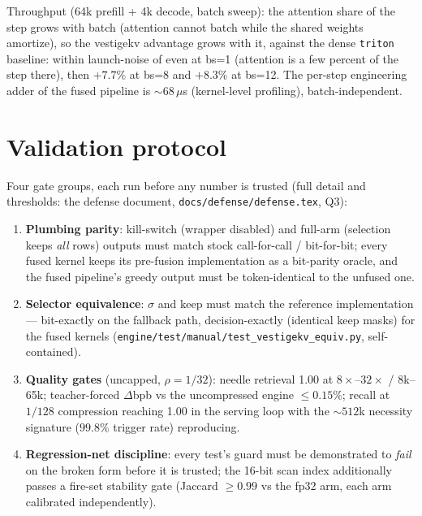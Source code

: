 \documentclass[11pt]{article}
\newcommand{\keep}{\mathrm{keep}}
\begin{document}
Throughput (64k prefill + 4k decode, batch sweep): the attention share of
the step grows with batch (attention cannot batch while the shared weights
amortize), so the vestigekv advantage grows with it, against the dense
\texttt{triton} baseline: within launch-noise of even at bs=1 (attention is
a few percent of the step there), then $+7.7\%$ at bs=8 and $+8.3\%$ at
bs=12. The per-step engineering adder of the fused pipeline is
${\sim}68\,\mu$s (kernel-level profiling), batch-independent.

\section{Validation protocol}
\label{sec:validate}

Four gate groups, each run before any number is trusted (full detail and
thresholds: the defense document, \texttt{docs/defense/defense.tex}, Q3):
\begin{enumerate}[itemsep=2pt]
\item \textbf{Plumbing parity}: kill-switch (wrapper disabled) and full-arm
(selection keeps \emph{all} rows) outputs must match stock call-for-call /
bit-for-bit; every fused kernel keeps its pre-fusion implementation as a
bit-parity oracle, and the fused pipeline's greedy output must be
token-identical to the unfused one.
\item \textbf{Selector equivalence}: $\sigma$ and $\keep$ must match the
reference implementation --- bit-exactly on the fallback path,
decision-exactly (identical keep masks) for the fused kernels
(\texttt{engine/test/manual/test\_vestigekv\_equiv.py}, self-contained).
\item \textbf{Quality gates} (uncapped, $\rho{=}1/32$): needle retrieval
1.00 at $8\times$--$32\times$ / 8k--65k; teacher-forced $\Delta$bpb vs the
uncompressed engine $\le 0.15\%$; recall at $1/128$ compression reaching
1.00 in the serving loop with the ${\sim}512$k necessity signature
($99.8\%$ trigger rate) reproducing.
\item \textbf{Regression-net discipline}: every test's guard must be
demonstrated to \emph{fail} on the broken form before it is trusted; the
16-bit scan index additionally passes a fire-set stability gate (Jaccard
$\ge 0.99$ vs the fp32 arm, each arm calibrated independently).
\end{enumerate}

\end{document}

